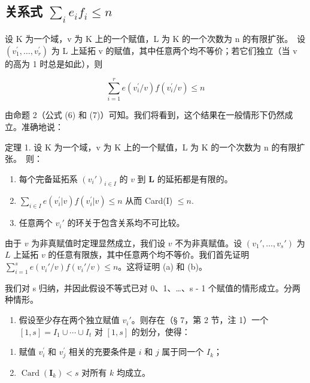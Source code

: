 \subsection{\texorpdfstring{关系式 \(\sum_{i} e_i f_i \leqslant n\)}{关系式 Σ ei fi ≤ n}}

设 K 为一个域，v 为 K 上的一个赋值，L 为 K 的一个次数为 n 的有限扩张。~设 \((v_{1}^{\prime}, \ldots, v_{r}^{\prime})\) 为 L 上延拓 v 的赋值，其中任意两个均不等价；若它们独立（当 v 的高为 1 时总是如此），则

\[
\sum_ {i = 1} ^ {r} e (v _ {i} ^ {\prime} / v) f (v _ {i} ^ {\prime} / v) \leqslant n
\]

由命题 2（公式 (6) 和 (7)）可知。我们将看到，这个结果在一般情形下仍然成立。准确地说：

定理 1. 设 K 为一个域，v 为 K 上的一个赋值，L 为 K 的一个次数为 n 的有限扩张。~则：

\begin{enumerate}
\def\labelenumi{(\alph{enumi})}
\item
  每个完备延拓系 \((v_i')_{i\in I}\) 的 \(v\) 到 \(\mathbf{L}\) 的延拓都是有限的。
\item
  \(\sum_{i\in I}e(v_i^{\prime}|v)f(v_i^{\prime}|v)\leqslant n\) 从而 Card(I) \(\leqslant n.\)
\item
  任意两个 \(v_{i}'\) 的环关于包含关系均不可比较。
\end{enumerate}

由于 \(v\) 为非真赋值时定理显然成立，我们设 \(v\) 不为非真赋值。设 \((v_1', \ldots, v_s')\) 为 \(L\) 上延拓 \(v\) 的任意有限族，其中任意两个均不等价。我们首先证明 \(\sum_{i=1}^{s} e(v_i'/v)f(v_i'/v) \leqslant n\)。这将证明 (a) 和 (b)。

我们对 s 归纳，并因此假设不等式已对 0、1、\ldots、s - 1 个赋值的情形成立。分两种情形。

\begin{enumerate}
\def\labelenumi{(\arabic{enumi})}
\tightlist
\item
  假设至少存在两个独立赋值 \(v_i'\)。则存在（§ 7，第 2 节，注 1）一个 \([1, s] = I_1 \cup \cdots \cup I_t\) 对 \([1, s]\) 的划分，使得：
\end{enumerate}

\begin{enumerate}
\def\labelenumi{(\roman{enumi})}
\item
  赋值 \(v_{i}^{\prime}\) 和 \(v_{j}^{\prime}\) 相关的充要条件是 \(i\) 和 \(j\) 属于同一个 \(I_{k}\)；
\item
  \(\operatorname{Card}(\mathbf{I}_k) < s\) 对所有 \(k\) 均成立。
\end{enumerate}

